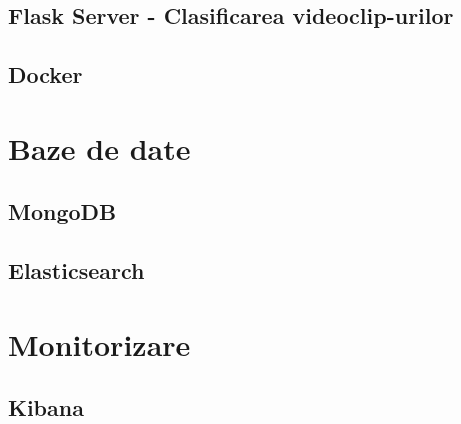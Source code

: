 \subsection{Flask Server - Clasificarea videoclip-urilor}


\subsection{Docker}

\section{Baze de date}

\subsection{MongoDB}
\subsection{Elasticsearch}
\section{Monitorizare}

\subsection{Kibana}
